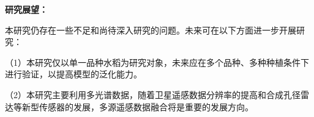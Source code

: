 \vspace{0.5cm}

\textbf{研究展望：}

本研究仍存在一些不足和尚待深入研究的问题。未来可在以下方面进一步开展研究：

\vspace{0.3cm}

（1）本研究仅以单一品种水稻为研究对象，未来应在多个品种、多种种植条件下进行验证，以提高模型的泛化能力。

\vspace{0.3cm}

（2）本研究主要利用多光谱数据，随着卫星遥感数据分辨率的提高和合成孔径雷达等新型传感器的发展，多源遥感数据融合将是重要的发展方向。
